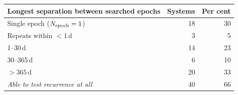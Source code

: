 \begin{tabular}{@{}lrr@{}}
\toprule
Longest separation between searched epochs & Systems & Per cent \\
\midrule
Single epoch ($N_{\rm epoch}=1$) & 18 & 30 \\
Repeats within $<1$\,d & 3 & 5 \\
1--30\,d & 14 & 23 \\
30--365\,d & 6 & 10 \\
$>365$\,d & 20 & 33 \\
\midrule
\emph{Able to test recurrence at all} & 40 & 66 \\
\bottomrule
\end{tabular}
